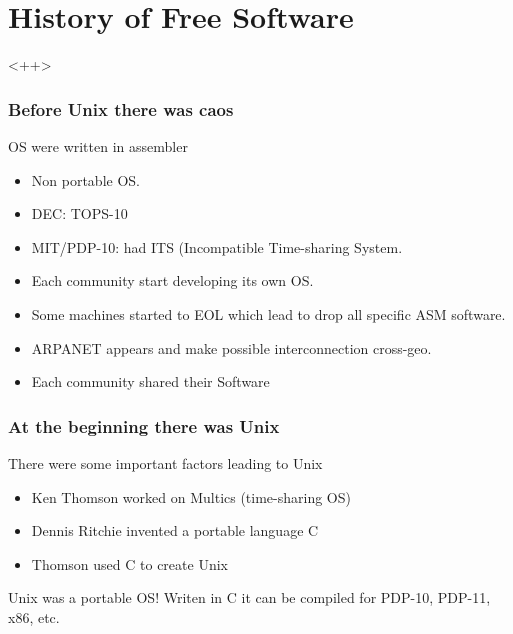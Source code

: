 \documentclass[hyperref={pdfpagelabels=false},xcolor=pst,pdf,fragile]{beamer}
\begin{document}
\section{History of Free Software}<++>

\begin{frame}
  \frametitle{Before Unix there was caos}

  \begin{block}{OS were written in assembler}
	  \begin{itemize}
		  \item Non portable OS.
		  \item DEC: TOPS-10
		  \item MIT/PDP-10: had ITS (Incompatible Time-sharing System.
	  \end{itemize}
  \end{block}

  \pause
  \begin{itemize}
	  \item Each community start developing its own OS.
	  \item Some machines started to EOL which lead to drop all specific
		  ASM software.
	  \item ARPANET appears and make possible interconnection cross-geo.
	  \item \alert{Each community shared their Software}
  \end{itemize}

\end{frame}

\begin{frame}
  \frametitle{At the beginning there was Unix}

  There were some important factors leading to Unix

  \begin{itemize}
	  \item Ken Thomson worked on Multics (time-sharing OS)
	  \item Dennis Ritchie invented a portable language C
	  \item Thomson used C to create Unix
  \end{itemize}

  \pause

  \begin{alertblock}{Unix was a portable OS!}
	  Writen in C it can be compiled for PDP-10, PDP-11, x86, etc.
  \end{alertblock}

\end{frame}
\end{document}
